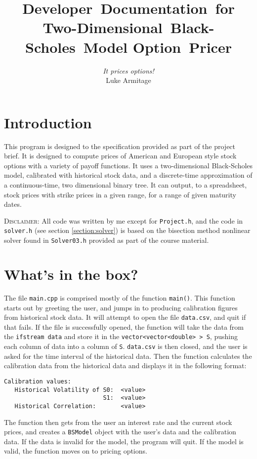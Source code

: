 \documentclass[12pt,a4paper]{article}
\author{\textit{It prices options!} 
		\\ Luke Armitage}
\date{}
\title{{\bfseries Developer~Documentation}~for 
Two-Dimensional~Black-Scholes~Model Option~Pricer}
\begin{document}
\maketitle


\section{Introduction}
This program is designed to the specification provided as part of the project 
brief. It is designed to compute prices of American and European style stock 
options with a variety of payoff functions. It uses a two-dimensional 
Black-Scholes model, calibrated with historical stock data, and a discrete-time 
approximation of a continuous-time, two dimensional binary tree. It can output, 
to a spreadsheet, stock prices with strike prices in a given range, for a range 
of given maturity dates. 

\textsc{Disclaimer}: All code was written by me except for \texttt{Project.h}, 
and the code in \texttt{solver.h} (see section \ref{section:solver}) is based on 
the bisection method nonlinear solver found in \texttt{Solver03.h} provided as 
part of the course material.

\section{What's in the box?}
The file \texttt{main.cpp} is comprised mostly of the function \texttt{main()}. 
This function starts out by greeting the user, and jumps in to producing 
calibration figures from historical stock data. It will attempt to open the file 
\texttt{data.csv}, and quit if that fails. If the file is successfully opened, 
the function will take the data from the \texttt{ifstream data} and store it in 
the \texttt{vector<vector<double> > S}, pushing each column of data into a 
column of \texttt{S}. \texttt{data.csv} is then closed, and the user is asked 
for the time interval of the historical data. Then the function calculates the 
calibration data from the historical data and displays it in the following 
format:
\begin{lstlisting}
Calibration values:
   Historical Volatility of S0:  <value>
                            S1:  <value>
   Historical Correlation:       <value>
\end{lstlisting}

The function then gets from the user an interest rate and the current stock 
prices, and creates a \texttt{BSModel} object with the user's data and the 
calibration data. If the data is invalid for the model, the program will quit. 
If the model is valid, the function moves on to pricing options.
\end{document}

